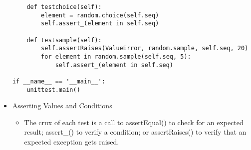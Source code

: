 \begin{itemize}
\begin{verbatim}
    def testchoice(self):
        element = random.choice(self.seq)
        self.assert_(element in self.seq)

    def testsample(self):
        self.assertRaises(ValueError, random.sample, self.seq, 20)
        for element in random.sample(self.seq, 5):
            self.assert_(element in self.seq)

if __name__ == '__main__':
    unittest.main()\end{verbatim}
    \normalcolor

  \item
    Asserting Values and Conditions
    \begin{itemize}
      \item[]
	The crux of each test is a call to assertEqual() to check for
	an expected result; assert\_() to verify a condition; or
	assertRaises() to verify that an expected exception gets
	raised.  
    \end{itemize}

\end{itemize}
